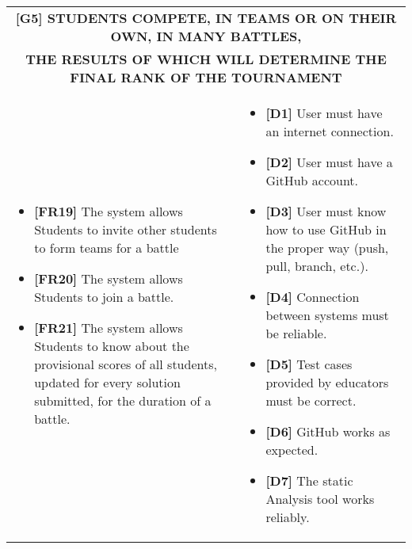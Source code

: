 \documentclass{article}
\begin{document}
\begin{table}[H]
\begin{adjustwidth}{-1in}{-1in}
 \renewcommand{\arraystretch}{1.5}
    \begin{tabular}{|p{9.5cm}|p{9.5cm}|}
        \hline
        \multicolumn{2}{|c|}{\textbf{[G5] STUDENTS COMPETE, IN TEAMS OR ON THEIR OWN, IN MANY BATTLES,}} \\
        \multicolumn{2}{|c|}{\textbf{THE RESULTS OF WHICH WILL DETERMINE THE FINAL RANK OF THE TOURNAMENT}} \\
        \hline
        \begin{itemize}[label={}, left=0pt, align=left, itemsep=5pt]
            \item \textbf{[FR19]} The system allows Students to invite other students to form teams for a battle
            \item \textbf{[FR20]} The system allows Students to join a battle.
            \item \textbf{[FR21]} The system allows Students to know about the provisional scores of all students, updated for every solution submitted, for the duration of a battle.
        \end{itemize} &
        \begin{itemize}[label={}, left=0pt, align=left, itemsep=5pt]
            \item \textbf{[D1]} User must have an internet connection.
            \item \textbf{[D2]} User must have a GitHub account.
            \item \textbf{[D3]} User must know how to use GitHub in the proper way (push, pull, branch, etc.).
            \item \textbf{[D4]} Connection between systems must be reliable.
            \item \textbf{[D5]} Test cases provided by educators must be correct.
            \item \textbf{[D6]} GitHub works as expected.
            \item \textbf{[D7]} The static Analysis tool works reliably.
        \end{itemize} \\
        \hline
    \end{tabular}
\end{adjustwidth}
\end{table}
\end{document}
